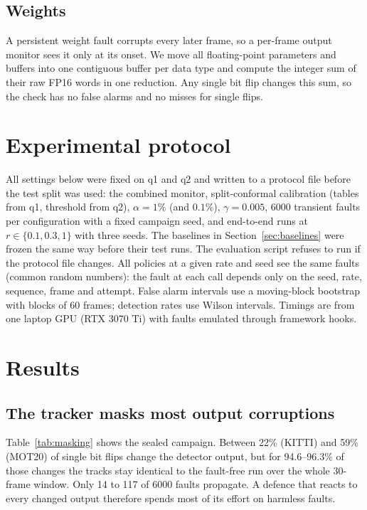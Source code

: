 \documentclass[11pt]{article}
\begin{document}
\subsection{Weights}
A persistent weight fault corrupts every later frame, so a per-frame output monitor sees it only at its onset. We move all floating-point parameters and buffers into one contiguous buffer per data type and compute the integer sum of their raw FP16 words in one reduction. Any single bit flip changes this sum, so the check has no false alarms and no misses for single flips.

\section{Experimental protocol}

All settings below were fixed on q1 and q2 and written to a protocol file before the test split was used: the combined monitor, split-conformal calibration (tables from q1, threshold from q2), $\alpha=1\%$ (and $0.1\%$), $\gamma=0.005$, 6000 transient faults per configuration with a fixed campaign seed, and end-to-end runs at $r\in\{0.1,0.3,1\}$ with three seeds. The baselines in Section~\ref{sec:baselines} were frozen the same way before their test runs. The evaluation script refuses to run if the protocol file changes. All policies at a given rate and seed see the same faults (common random numbers): the fault at each call depends only on the seed, rate, sequence, frame and attempt. False alarm intervals use a moving-block bootstrap \citep{kunsch1989jackknife} with blocks of 60 frames; detection rates use Wilson intervals. Timings are from one laptop GPU (RTX 3070 Ti) with faults emulated through framework hooks.

\section{Results}

\subsection{The tracker masks most output corruptions}
Table~\ref{tab:masking} shows the sealed campaign. Between 22\% (KITTI) and 59\% (MOT20) of single bit flips change the detector output, but for 94.6--96.3\% of those changes the tracks stay identical to the fault-free run over the whole 30-frame window. Only 14 to 117 of 6000 faults propagate. A defence that reacts to every changed output therefore spends most of its effort on harmless faults.
\end{document}
